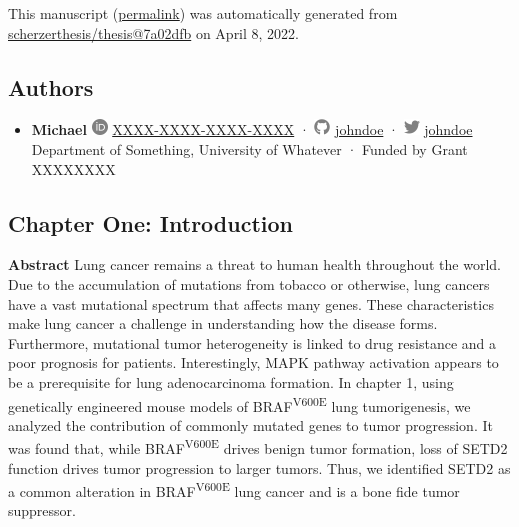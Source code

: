This manuscript
(\href{https://scherzerthesis.github.io/thesis/v/7a02dfb8a9274d8e9859aa2cf500dd7720d847a5/}{permalink})
was automatically generated
from \href{https://github.com/scherzerthesis/thesis/tree/7a02dfb8a9274d8e9859aa2cf500dd7720d847a5}{scherzerthesis/thesis@7a02dfb}
on April 8, 2022.

\hypertarget{authors}{%
\subsection{Authors}\label{authors}}

\begin{itemize}
\tightlist
\item
  \textbf{Michael}
  \includegraphics[width=0.16667in,height=0.16667in]{images/orcid.svg}
  \href{https://orcid.org/XXXX-XXXX-XXXX-XXXX}{XXXX-XXXX-XXXX-XXXX}
  · \includegraphics[width=0.16667in,height=0.16667in]{images/github.svg}
  \href{https://github.com/johndoe}{johndoe}
  · \includegraphics[width=0.16667in,height=0.16667in]{images/twitter.svg}
  \href{https://twitter.com/johndoe}{johndoe}
  Department of Something, University of Whatever
  · Funded by Grant XXXXXXXX
\end{itemize}

\hypertarget{chapter-one-introduction}{%
\subsection{Chapter One: Introduction}\label{chapter-one-introduction}}

\textbf{Abstract}
Lung cancer remains a threat to human health throughout the world. Due to the accumulation of mutations from tobacco or otherwise, lung cancers have a vast mutational spectrum that affects many genes. These characteristics make lung cancer a challenge in understanding how the disease forms. Furthermore, mutational tumor heterogeneity is linked to drug resistance and a poor prognosis for patients. Interestingly, MAPK pathway activation appears to be a prerequisite for lung adenocarcinoma formation. In chapter 1, using genetically engineered mouse models of BRAF\textsuperscript{V600E} lung tumorigenesis, we analyzed the contribution of commonly mutated genes to tumor progression. It was found that, while BRAF\textsuperscript{V600E} drives benign tumor formation, loss of SETD2 function drives tumor progression to larger tumors. Thus, we identified SETD2 as a common alteration in BRAF\textsuperscript{V600E} lung cancer and is a bone fide tumor suppressor.

